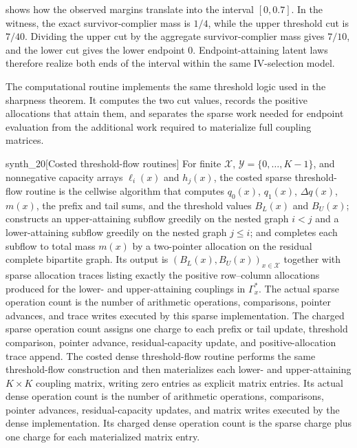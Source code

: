  shows how the observed margins translate into the interval \([0,0.7]\).  In the witness, the exact survivor-complier mass is \(1/4\), while the upper threshold cut is \(7/40\).  Dividing the upper cut by the aggregate survivor-complier mass gives \(7/10\), and the lower cut gives the lower endpoint \(0\).  Endpoint-attaining latent laws therefore realize both ends of the interval within the same IV-selection model.

The computational routine implements the same threshold logic used in the sharpness theorem.  It computes the two cut values, records the positive allocations that attain them, and separates the sparse work needed for endpoint evaluation from the additional work required to materialize full coupling matrices.

\begin{definitionv}{synth_20}[Costed threshold-flow routines]
For finite \(\mathcal X\), \(\mathcal Y=\{0,\ldots,K-1\}\), and nonnegative capacity arrays \(\ell_i(x)\) and \(h_j(x)\), the costed sparse threshold-flow routine is the cellwise algorithm that computes \(q_0(x)\), \(q_1(x)\), \(\Delta q(x)\), \(m(x)\), the prefix and tail sums, and the threshold values \(B_L(x)\) and \(B_U(x)\); constructs an upper-attaining subflow greedily on the nested graph \(i<j\) and a lower-attaining subflow greedily on the nested graph \(j\le i\); and completes each subflow to total mass \(m(x)\) by a two-pointer allocation on the residual complete bipartite graph. Its output is \((B_L(x),B_U(x))_{x\in\mathcal X}\) together with sparse allocation traces listing exactly the positive row--column allocations produced for the lower- and upper-attaining couplings in \(\Gamma_x^{\ast}\). The actual sparse operation count is the number of arithmetic operations, comparisons, pointer advances, and trace writes executed by this sparse implementation. The charged sparse operation count assigns one charge to each prefix or tail update, threshold comparison, pointer advance, residual-capacity update, and positive-allocation trace append. The costed dense threshold-flow routine performs the same threshold-flow construction and then materializes each lower- and upper-attaining \(K\times K\) coupling matrix, writing zero entries as explicit matrix entries. Its actual dense operation count is the number of arithmetic operations, comparisons, pointer advances, residual-capacity updates, and matrix writes executed by the dense implementation. Its charged dense operation count is the sparse charge plus one charge for each materialized matrix entry.
\end{definitionv}

